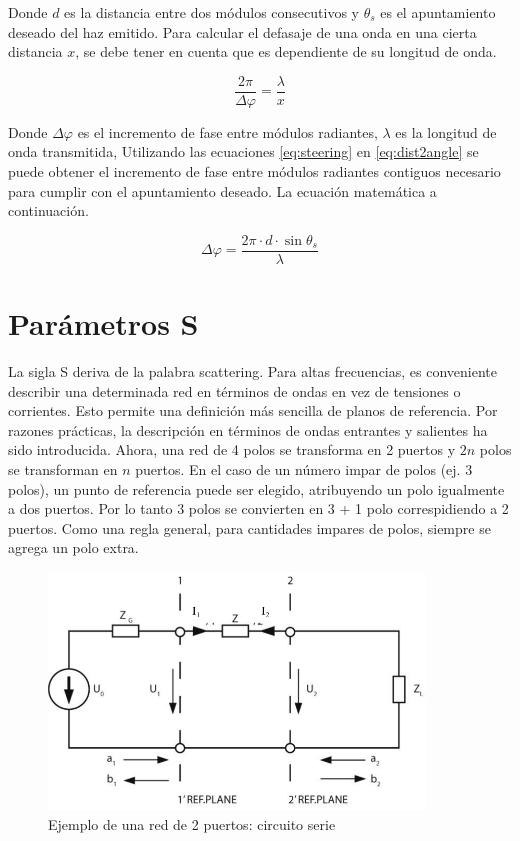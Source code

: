 Donde $d$ es la distancia entre dos módulos consecutivos y $\theta_s$ es el apuntamiento deseado del haz emitido. Para calcular
el defasaje de una onda en una cierta distancia $x$, se debe tener en cuenta que es dependiente de su longitud de onda. 

\begin{equation}
	\dfrac{2\pi}{\Delta\varphi} = \dfrac{\lambda}{x}
	\label{eq:dist2angle}
\end{equation}

Donde $\Delta\varphi$ es el incremento de fase entre módulos radiantes, $\lambda$ es la longitud de onda transmitida, 
Utilizando las ecuaciones \ref{eq:steering} en \ref{eq:dist2angle} se puede obtener el incremento de fase entre módulos radiantes
contiguos necesario para cumplir con el apuntamiento deseado. La ecuación matemática a continuación.

\begin{equation}
	\Delta\varphi = \dfrac{2\pi\cdot d\cdot\sin{\theta_s}}{\lambda}
\end{equation}


\section{Parámetros S}

La sigla S deriva de la palabra scattering. Para altas frecuencias, es conveniente describir una
determinada red en términos de ondas en vez de tensiones o corrientes. Esto permite una definición más 
sencilla de planos de referencia. Por razones prácticas, la descripción en términos de ondas entrantes
y salientes ha sido introducida. Ahora, una red de 4 polos se transforma en 2 puertos y $2n$ polos se 
transforman en $n$ puertos. En el caso de un número impar de polos (ej. 3 polos), un punto de referencia
puede ser elegido, atribuyendo un polo igualmente a dos puertos. Por lo tanto 3 polos se convierten en 
3 + 1 polo correspidiendo a 2 puertos. Como una regla general, para cantidades impares de polos, siempre
se agrega un polo extra.

\begin{figure}[H]
 \centering
 \includegraphics[width=10cm]{gfx/sParameters1.png}
 \caption{Ejemplo de una red de 2 puertos: circuito serie}
 \label{fig:esquema_serie}
\end{figure}

